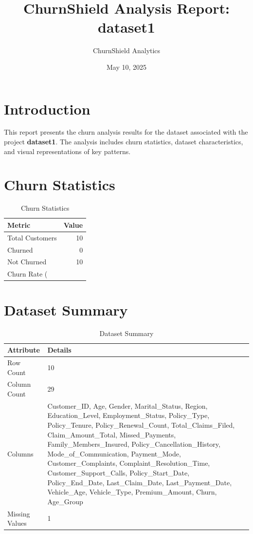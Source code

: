 \documentclass[a4paper,12pt]{article}
\begin{document}
\title{ChurnShield Analysis Report: dataset1}
\author{ChurnShield Analytics}
\date{ May 10, 2025 }
\maketitle

\section{Introduction}
This report presents the churn analysis results for the dataset associated with the project \textbf{dataset1}. The analysis includes churn statistics, dataset characteristics, and visual representations of key patterns.

\section{Churn Statistics}
\begin{table}[h]
\centering
\begin{tabular}{lr}
\toprule
Metric & Value \\
\midrule
Total Customers & 10 \\
Churned & 0 \\
Not Churned & 10 \\
Churn Rate (%
\bottomrule
\end{tabular}
\caption{Churn Statistics}
\label{tab:churn_stats}
\end{table}

\section{Dataset Summary}
\begin{table}[h]
\centering
\begin{tabular}{ll}
\toprule
Attribute & Details \\
\midrule
Row Count & 10 \\
Column Count & 29 \\
Columns & Customer_ID, Age, Gender, Marital_Status, Region, Education_Level, Employment_Status, Policy_Type, Policy_Tenure, Policy_Renewal_Count, Total_Claims_Filed, Claim_Amount_Total, Missed_Payments, Family_Members_Insured, Policy_Cancellation_History, Mode_of_Communication, Payment_Mode, Customer_Complaints, Complaint_Resolution_Time, Customer_Support_Calls, Policy_Start_Date, Policy_End_Date, Last_Claim_Date, Last_Payment_Date, Vehicle_Age, Vehicle_Type, Premium_Amount, Churn, Age_Group \\
Missing Values & 1 \\
\bottomrule
\end{tabular}
\caption{Dataset Summary}
\label{tab:dataset_summary}
\end{table}
\end{document}
